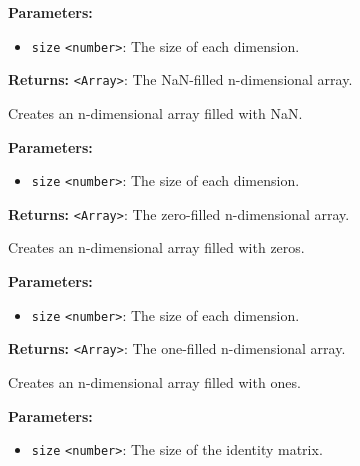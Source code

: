 \documentclass[12pt,a4paper]{article}
\begin{document}
\noindent \textbf{Parameters:}
\begin{itemize}
  \item \texttt{size} \texttt{<number>}: The size of each dimension.
\end{itemize}

\noindent \textbf{Returns:} \texttt{<Array>}: The NaN-filled n-dimensional array.

\noindent Creates an n-dimensional array filled with NaN.

\vspace{5mm}
\noindent {}


\noindent \textbf{Parameters:}
\begin{itemize}
  \item \texttt{size} \texttt{<number>}: The size of each dimension.
\end{itemize}

\noindent \textbf{Returns:} \texttt{<Array>}: The zero-filled n-dimensional array.

\noindent Creates an n-dimensional array filled with zeros.

\vspace{5mm}
\noindent {}


\noindent \textbf{Parameters:}
\begin{itemize}
  \item \texttt{size} \texttt{<number>}: The size of each dimension.
\end{itemize}

\noindent \textbf{Returns:} \texttt{<Array>}: The one-filled n-dimensional array.

\noindent Creates an n-dimensional array filled with ones.

\vspace{5mm}
\noindent {}


\noindent \textbf{Parameters:}
\begin{itemize}
  \item \texttt{size} \texttt{<number>}: The size of the identity matrix.
\end{itemize}
\end{document}
